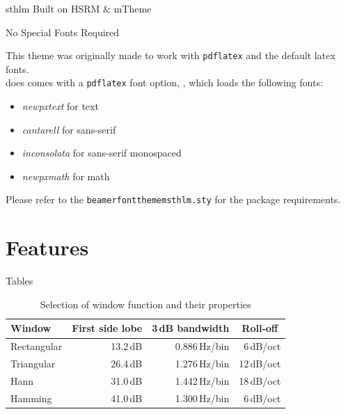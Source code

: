 \documentclass[newPxFont]{beamer}
\begin{document}
\begin{frame}[c]{sthlm Built on HSRM \& mTheme}

\begin{frame}[c]{No Special Fonts Required}

This theme was originally made to work with \texttt{pdflatex} and the default latex fonts.\\
\vspace{1em}
 does comes with a \texttt{pdflatex} font option, , which loads the following fonts:

\begin{itemize}
	\item \emph{newpxtext} for text
	\item \emph{cantarell} for sans-serif
	\item \emph{inconsolata} for sans-serif monospaced
	\item \emph{newpxmath} for math
\end{itemize}

Please refer to the \texttt{beamerfontthememsthlm.sty} for the package requirements.

\end{frame}


%
%
\section{Features}


\begin{frame}{Tables}
\begin{table}[]
	\caption{Selection of window function and their properties}
	\begin{tabular}[]{lrrr}
		\toprule
		\textbf{Window}			& \multicolumn{1}{c}{\textbf{First side lobe}}
		                    & \multicolumn{1}{c}{\textbf{3\,dB bandwidth}}
		                    & \multicolumn{1}{c}{\textbf{Roll-off}} \\
		\midrule
		Rectangular				& 13.2\,dB	& 0.886\,Hz/bin	& 6\,dB/oct		\\[0.25em]
		Triangular				& 26.4\,dB	& 1.276\,Hz/bin	& 12\,dB/oct	\\[0.25em]
		Hann					& 31.0\,dB	& 1.442\,Hz/bin	& 18\,dB/oct	\\[0.25em]
		Hamming					& 41.0\,dB	& 1.300\,Hz/bin	& 6\,dB/oct		\\
		\bottomrule
	\end{tabular}
	\label{tab:WindowFunctions}
\end{table}
\end{frame}


\end{frame}
\end{document}
